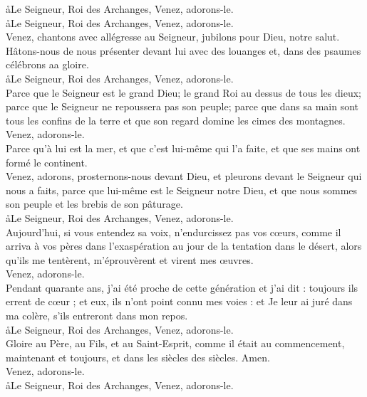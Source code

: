 \documentclass[twoside]{article}
\begin{document}
\begin{paracol}[1]{2}
\vfill
\aa Le Seigneur, Roi des Archanges, \GreSpecial{*} Venez, adorons-le.\\
\aa Le Seigneur, Roi des Archanges, \GreSpecial{*} Venez, adorons-le.\\
\vv Venez, chantons avec allégresse au Seigneur, jubilons pour Dieu, notre salut.\\
\vfill
\newpage
\null\vfill
Hâtons-nous de nous présenter devant lui avec des louanges et, dans des psaumes célébrons aa gloire.\\
\aa Le Seigneur, Roi des Archanges, \GreSpecial{*} Venez, adorons-le.\\
\vv Parce que le Seigneur est le grand Dieu; le grand Roi au dessus de tous les dieux; parce que le Seigneur ne repoussera pas son peuple; parce que dans sa main sont tous les confins de la terre et que son regard domine les cimes des montagnes.\\
\GreSpecial{*} Venez, adorons-le.\\
\vv Parce qu'à lui est la mer, et que c'est lui-même qui l'a faite, et que ses mains ont formé le continent.\\
\vfill
\newpage
\null\vfill
{} Venez, adorons, prosternons-nous devant Dieu, et pleurons devant le Seigneur qui nous a faits,  parce que lui-même est le Seigneur notre Dieu, et que nous sommes son peuple et les brebis de son pâturage.\\
\aa Le Seigneur, Roi des Archanges, \GreSpecial{*} Venez, adorons-le.\\
\vv Aujourd'hui, si vous entendez sa voix, n'endurcissez pas vos cœurs, comme il arriva à vos pères dans l'exaspération au jour de la tentation dans le désert, alors qu'ils me tentèrent, m'éprouvèrent et virent mes œuvres.\\
\vfill
\newpage
\null\vfill
\GreSpecial{*} Venez, adorons-le.\\
\vv Pendant quarante ans, j'ai été proche de cette génération et j'ai dit : toujours ils errent de cœur ; et eux, ils n'ont point connu mes voies : et Je leur ai juré dans ma colère, s'ils entreront dans mon repos.\\
\aa Le Seigneur, Roi des Archanges, \GreSpecial{*} Venez, adorons-le.\\
\vv Gloire au Père, au Fils, et au Saint-Esprit, comme il était au commencement, maintenant et toujours, et dans les siècles des siècles. Amen.\\
\GreSpecial{*} Venez, adorons-le.\\
\aa Le Seigneur, Roi des Archanges, \GreSpecial{*} Venez, adorons-le.\\
\vfill
\switchcolumn*


\end{paracol}
\end{document}

